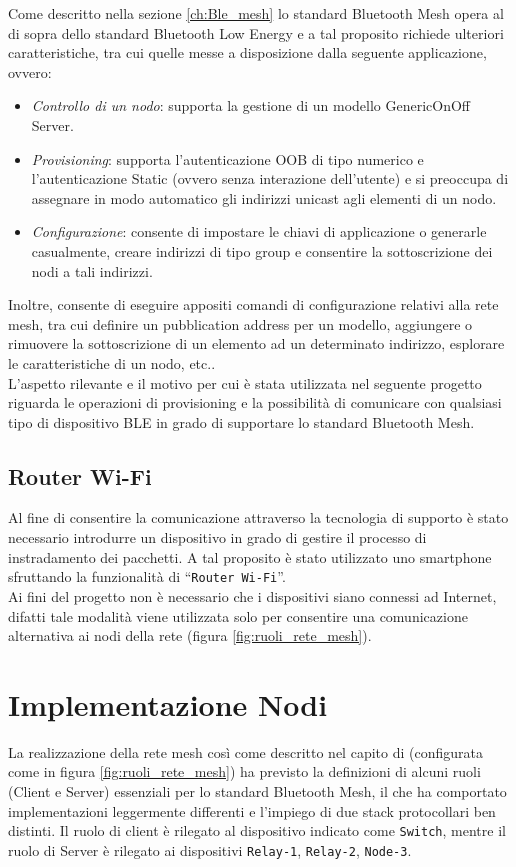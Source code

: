 Come descritto nella sezione \ref{ch:Ble_mesh} lo standard Bluetooth Mesh opera al di sopra dello standard Bluetooth Low Energy e a tal proposito richiede ulteriori caratteristiche, tra cui quelle messe a disposizione dalla seguente applicazione, ovvero: 
\begin{itemize}
    \item \textit{Controllo di un nodo}: supporta la gestione di un modello GenericOnOff Server.
    \item \textit{Provisioning}: supporta l'autenticazione OOB di tipo numerico e l'autenticazione Static (ovvero senza interazione dell'utente) e si preoccupa di assegnare in modo automatico gli indirizzi unicast agli elementi di un nodo.
    \item \textit{Configurazione}: consente di impostare le chiavi di applicazione o generarle casualmente, creare indirizzi di tipo group e consentire la sottoscrizione dei nodi a tali indirizzi.
\end{itemize}
Inoltre, consente di eseguire appositi comandi di configurazione relativi alla rete mesh, tra cui definire un pubblication address per un modello, aggiungere o rimuovere la sottoscrizione di un elemento ad un determinato indirizzo, esplorare le caratteristiche di un nodo, etc..\\
L'aspetto rilevante e il motivo per cui è stata utilizzata nel seguente progetto riguarda le operazioni di provisioning e la possibilità di comunicare con qualsiasi tipo di dispositivo BLE in grado di supportare lo standard Bluetooth Mesh.

\subsection{Router Wi-Fi}
Al fine di consentire la comunicazione attraverso la tecnologia di supporto è stato necessario introdurre un dispositivo in grado di gestire il processo di instradamento dei pacchetti. A tal proposito è stato utilizzato uno smartphone sfruttando la funzionalità di ``\texttt{Router Wi-Fi}''. \\
Ai fini del progetto non è necessario che i dispositivi siano connessi ad Internet, difatti tale modalità viene utilizzata solo per consentire una comunicazione alternativa ai nodi della rete (figura \ref{fig:ruoli_rete_mesh}).

\section{Implementazione Nodi}
La realizzazione della rete mesh così come descritto nel capito di  (configurata come in figura \ref{fig:ruoli_rete_mesh}) ha previsto la definizioni di alcuni ruoli (Client e Server) essenziali per lo standard Bluetooth Mesh, il che ha comportato implementazioni leggermente differenti e l'impiego di due stack protocollari ben distinti.
Il ruolo di client è rilegato al dispositivo indicato come \texttt{Switch}, mentre il ruolo di Server è rilegato ai dispositivi \texttt{Relay-1}, \texttt{Relay-2}, \texttt{Node-3}.\\

